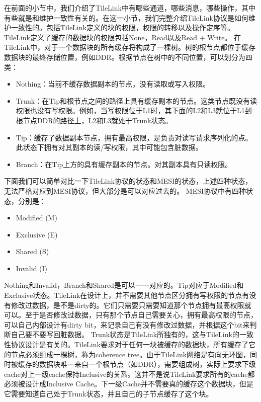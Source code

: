 \begin{center}
在前面的小节中，我们介绍了TileLink中有哪些通道，哪些消息，哪些操作，其中有些就是和维护一致性有关的。在这一小节，我们完整介绍TileLink协议是如何维护一致性的。包括TileLink定义的块的权限，权限的转移以及操作定序等。
TileLink定义了缓存的数据块的权限包括None，Read以及Read + Write。
在TileLink中，对于一个数据块的所有缓存将构成了一棵树。树的根节点都位于缓存数据块的最终存储位置，例如DDR。根据节点在树中的不同位置，可以划分为四类：
\begin{itemize}
	\item Nothing：当前不缓存数据副本的节点，没有读取或写入权限。
	\item Trunk：在Tip和根节点之间的路径上具有缓存副本的节点。这类节点既没有读权限也没有写权限。例如，当写权限位于L1时，其下面的L2和L3就位于L1到根节点DDR的路径上，L2和L3就处于Trunk状态。
	\item Tip：缓存了数据副本节点，拥有最高权限，是负责对读写请求序列化的点。此状态下拥有对其副本的读/写权限，其中可能包含脏数据。
	\item Branch：在Tip上方的具有缓存副本的节点。对其副本具有只读权限。
\end{itemize}

下面我们可以简单对比一下TileLink协议的状态和MESI的状态，上述四种状态，无法严格对应到MESI协议，但大部分是可以对应过去的。
MESI协议中有四种状态，分别是：
\begin{itemize}
	\item Modified (M)
	\item Exclusive (E)
	\item Shared (S)
	\item Invalid (I)
\end{itemize}

Nothing和Invalid，Branch和Shared是可以一一对应的。Tip对应于Modified和Exclusive状态。TileLink在设计上，并不需要其他节点区分拥有写权限的节点有没有修改过数据，是不是dirty的。它们只需要只需要知道那个节点拥有最高权限就可以。至于是否修改过数据，只有那个节点自己需要关心，拥有最高权限的节点，可以自己内部设计有dirty bit，来记录自己有没有修改过数据，并根据这个bit来判断自己要不要写回脏数据。
Trunk状态是TileLink所独有的，这与TileLink的一致性协议设计是有关的。TileLink要求对于任何一块被缓存的数据块，所有缓存了它的节点必须组成一棵树，称为coherence tree。由于TileLink网络是有向无环图，同时被缓存的数据块唯一来自一个根节点（如DDR），需要组成树，实际上要求下级cache对上一级cache保持Inclusive的关系。这并不是说TileLink要求所有的cache都必须被设计成Inclusive Cache。下一级Cache并不需要真的缓存这个数据块，但是它需要知道自己处于Trunk状态，并且自己的子节点缓存了这个块。


\end{center}
